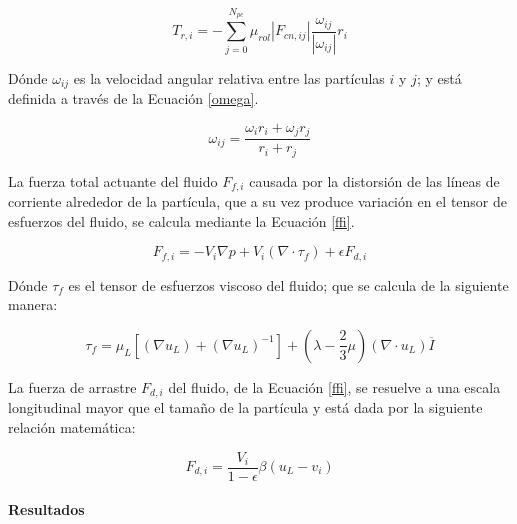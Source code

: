 \begin{equation}
	T_{r,i} = - \sum _{j=0} ^{N_{pc}} \mu _{rol}  \left|F_{cn, ij} \right| \frac{\omega _{ij}}{\left| \omega _{ij} \right|} r_i
	\label{rolling}
\end{equation}

\noindent
\justify

D\'onde $\omega _{ij}$ es la velocidad angular relativa entre las part\'iculas $i$ y $j$; y est\'a definida a trav\'es de la Ecuaci\'on \ref{omega}.

\begin{equation}
	\omega _{ij} = \frac{\omega _i r_i + \omega _j r_j}{r_i + r_j}
	\label{omega}
\end{equation}

\noindent
\justify

La fuerza total actuante del fluido $F_{f,i}$ causada por la distorsi\'on de las l\'ineas de corriente alrededor de la part\'icula, que a su vez produce variaci\'on en el tensor de esfuerzos del fluido, se calcula mediante la Ecuaci\'on \ref{ffi}.

\begin{equation}
	F_{f,i} = - V_i \nabla p + V_i \left( \nabla \cdot \tau _f \right) + \epsilon F_{d,i}
	\label{ffi}
\end{equation}

\noindent
\justify

D\'onde $\tau _f$ es el tensor de esfuerzos viscoso del fluido; que se calcula de la siguiente manera:

\begin{equation}
	\tau _f = \mu _L \left[ \left( \nabla u_L \right) + \left( \nabla u_L \right) ^{-1} \right] + \left(\lambda - \frac{2}{3} \mu \right) \left( \nabla \cdot u_L \right) \overline{I}
\end{equation}

\noindent
\justify

La fuerza de arrastre $F_{d,i}$ del fluido, de la Ecuaci\'on \ref{ffi}, se resuelve a una escala longitudinal mayor que el tama\~no de la part\'icula y est\'a dada por la siguiente relaci\'on matem\'atica:

\begin{equation}
	F_{d,i} = \frac{V_i}{1 - \epsilon} \beta \left( u_L - v_i \right)
\end{equation}

\paragraph{Resultados} \label{CFDEM:resultados}

